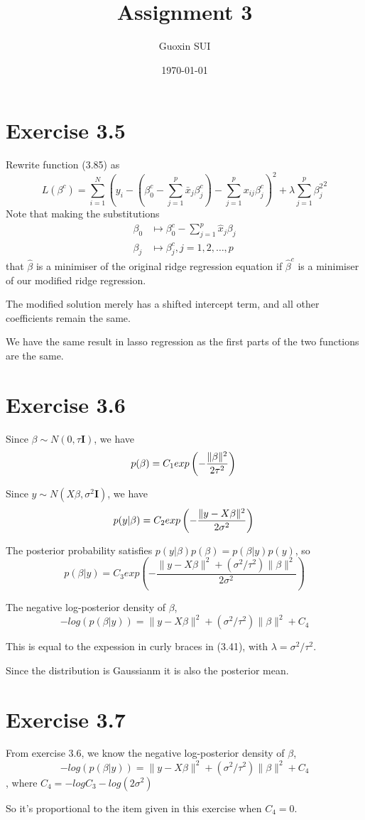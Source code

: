 \documentclass{article}
\title{Assignment 3}
\author{Guoxin SUI}
\date{\today}
\begin{document}
\maketitle

\section{Exercise 3.5}

Rewrite function (3.85) as  \[
    L(\beta^c) = \sum_{i=1}^{N}\left(y_i - \left(\beta_0^c - \sum_{j=1}^{p} \bar x_j \beta_j^c \right) - \sum_{j=1}^p x_{ij} \beta_j^c \right)^2 + \lambda \sum_{j=1}^p {\beta_j^2}^2
    \]
Note that making the substitutions \begin{align*}
    \beta_0 &\mapsto \beta_0^c - \sum_{j=1}^p \hat x_j \beta_j \\
    \beta_j &\mapsto \beta^c_j, j = 1, 2, \dots, p
\end{align*} that $\hat \beta$ is a minimiser of the original ridge regression equation if $\hat \beta^c$ is a minimiser of our modified ridge regression.

The modified solution merely has a shifted intercept term, and all other coefficients remain the same.

We have the same result in lasso regression as the first parts of the two functions are the same.

\section{Exercise 3.6}

Since $\beta \sim N(0, \tau \mathbf{I})$, we have \[
p(\beta) = C_1 exp \left( -\frac{\| \beta \| ^2 }{2\tau ^2}\right) \\
\]

Since $y \sim N(X \beta, \sigma^2 \mathbf{I})$, we have \[
p(y|\beta) = C_2 exp \left( -\frac{\|y-X \beta \| ^2 }{2\sigma ^2}\right) \\
\]

The posterior probability satisfies $p(y|\beta)p(\beta) = p(\beta|y)p(y)$, so \[
p(\beta|y) = C_3 exp \left( -\frac{\|y-X \beta \| ^2 + (\sigma^2/\tau^2)\| \beta \| ^2}{2\sigma ^2}\right)
\]

The negative log-posterior density of $\beta$,\[
    -log(p(\beta|y))= \|y-X \beta \| ^2 + (\sigma^2/\tau^2)\| \beta \| ^2 + C_4
\]

This is equal to the expession in curly braces in (3.41), with $\lambda = \sigma^2/\tau^2$.

Since the distribution is Gaussianm it is also the posterior mean.

\section{Exercise 3.7}

From exercise 3.6, we know the negative log-posterior density of $\beta$,\[
    -log(p(\beta|y))= \|y-X \beta \| ^2 + (\sigma^2/\tau^2)\| \beta \| ^2 + C_4
\]
, where $C_4 = -logC_3 - log(2\sigma^2) $

So it's proportional to the item given in this exercise when $C_4 = 0$.
\end{document}
